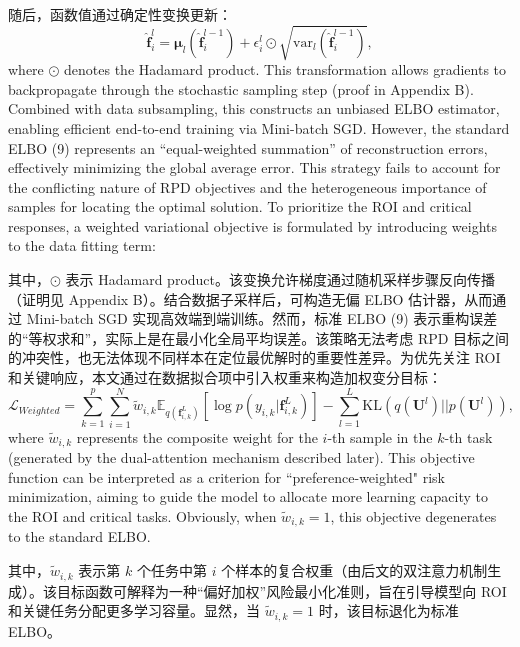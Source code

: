 \documentclass[11pt]{article}
\begin{document}
随后，函数值通过确定性变换更新：
\begin{equation}
	\widehat{\mathbf{f}}_{i}^{l}={{\mathbf{\mu }}_{l}}(\widehat{\mathbf{f}}_{i}^{l-1})+\epsilon _{i}^{l}\odot \sqrt{\text{va}{{\text{r}}_{l}}(\widehat{\mathbf{f}}_{i}^{l-1})},
\end{equation}
where $\odot$ denotes the Hadamard product. This transformation allows gradients to backpropagate through the stochastic sampling step (proof in Appendix B). Combined with data subsampling, this constructs an unbiased ELBO estimator, enabling efficient end-to-end training via Mini-batch SGD.
However, the standard ELBO (9) represents an ``equal-weighted summation'' of reconstruction errors, effectively minimizing the global average error. This strategy fails to account for the conflicting nature of RPD objectives and the heterogeneous importance of samples for locating the optimal solution. To prioritize the ROI and critical responses, a weighted variational objective is formulated by introducing weights to the data fitting term:

其中，$\odot$ 表示 Hadamard product。该变换允许梯度通过随机采样步骤反向传播（证明见 Appendix B）。结合数据子采样后，可构造无偏 ELBO 估计器，从而通过 Mini-batch SGD 实现高效端到端训练。然而，标准 ELBO (9) 表示重构误差的“等权求和”，实际上是在最小化全局平均误差。该策略无法考虑 RPD 目标之间的冲突性，也无法体现不同样本在定位最优解时的重要性差异。为优先关注 ROI 和关键响应，本文通过在数据拟合项中引入权重来构造加权变分目标：
\begin{equation}
	{{\mathcal{L}}_{Weighted}}=\sum\limits_{k=1}^{p}{\sum\limits_{i=1}^{N}{{{{\tilde{w}}}_{i,k}}}}{{\mathbb{E}}_{q(\mathbf{f}_{i,k}^{L})}}[\log p({{y}_{i,k}}|\mathbf{f}_{i,k}^{L})]-\sum\limits_{l=1}^{L}{\text{KL}}(q({{\mathbf{U}}^{l}})||p({{\mathbf{U}}^{l}})),
\end{equation}
where $\tilde{w}_{i,k}$ represents the composite weight for the $i$-th sample in the $k$-th task (generated by the dual-attention mechanism described later). This objective function can be interpreted as a criterion for ``preference-weighted" risk minimization, aiming to guide the model to allocate more learning capacity to the ROI and critical tasks. Obviously, when $\tilde{w}_{i,k}=1$, this objective degenerates to the standard ELBO.

其中，$\tilde{w}_{i,k}$ 表示第 $k$ 个任务中第 $i$ 个样本的复合权重（由后文的双注意力机制生成）。该目标函数可解释为一种“偏好加权”风险最小化准则，旨在引导模型向 ROI 和关键任务分配更多学习容量。显然，当 $\tilde{w}_{i,k}=1$ 时，该目标退化为标准 ELBO。
\end{document}
